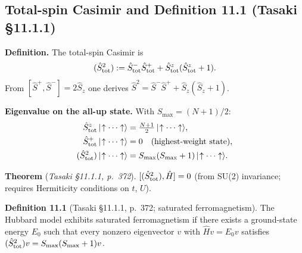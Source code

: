 \documentclass[a4paper,11pt]{article}
\begin{document}
\subsection{Total-spin Casimir and Definition 11.1 (Tasaki §11.1.1)}
\label{subsec:hubbard-saturated-ferro}

\noindent\textbf{Definition.}
The total-spin Casimir is
\[
  (\hat{S}^2_{\rm tot})
  := \hat{S}^-_{\rm tot}\hat{S}^+_{\rm tot}
     + \hat{S}^z_{\rm tot}(\hat{S}^z_{\rm tot}+1).
\]
From $[\hat{S}^+,\hat{S}^-]=2\hat{S}_z$ one derives
$\hat{S}^2 = \hat{S}^-\hat{S}^+ + \hat{S}_z(\hat{S}_z+1)$.

\noindent\textbf{Eigenvalue on the all-up state.}
With $S_{\max} = (N+1)/2$:
\begin{align*}
  \hat{S}^z_{\rm tot}\,|\!\uparrow\cdots\uparrow\rangle
    &= \tfrac{N+1}{2}\,|\!\uparrow\cdots\uparrow\rangle,\\
  \hat{S}^+_{\rm tot}\,|\!\uparrow\cdots\uparrow\rangle
    &= 0 \quad\text{(highest-weight state)},\\
  (\hat{S}^2_{\rm tot})\,|\!\uparrow\cdots\uparrow\rangle
    &= S_{\max}(S_{\max}+1)\,|\!\uparrow\cdots\uparrow\rangle.
\end{align*}

\noindent\textbf{Theorem} (\textit{Tasaki §11.1.1, p.~372}).
$[(\hat{S}^2_{\rm tot}),\hat{H}] = 0$
(from SU(2) invariance; requires Hermiticity conditions on $t$, $U$).

\noindent\textbf{Definition 11.1} (Tasaki §11.1.1, p.~372; saturated ferromagnetism).
The Hubbard model exhibits saturated ferromagnetism if there exists a
ground-state energy $E_0$ such that every nonzero eigenvector $v$
with $\hat H v = E_0 v$ satisfies
$(\hat{S}^2_{\rm tot})v = S_{\max}(S_{\max}+1)v$.
\end{document}

